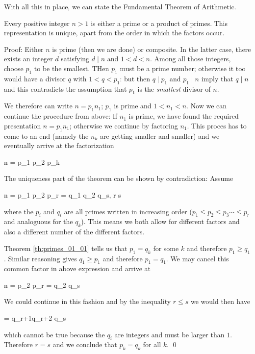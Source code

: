With all this in place, we can state the Fundamental Theorem of Arithmetic.

\begin{theorem}
    Every positive integer $n > 1$ is either a prime or a product of primes. This representation is unique, apart from the order in which the factors occur.
\end{theorem}

Proof: Either $n$ is prime (then we are done) or composite. In the latter case, there exists an integer $d$ satisfying $d \mid n$ and $1 < d < n$. Among all those integers, choose $p_1$ to be the smallest. THen $p_1$ must be a prime number; otherwise it too would have a divisor $q$ with $1 < q < p_1$: but then $q \mid p_1$ and $p_1 \mid n$ imply that $q \mid n$ and this contradicts the assumption that $p_1$ is the \emph{smallest} divisor of $n$.

We therefore can write $n = p_1 n_1$; $p_1$ is prime and $1 < n_1 < n$. Now we can continue the procedure from above: If $n_1$ is prime, we have found the required presentation $n = p_1 n_1$; otherwise we continue by factoring $n_1$. This proces has to come to an end (namely the $n_k$ are getting smaller and smaller) and we eventually arrive at the factorization

\bee
n = p_1 p_2 \cdots p_k
\eee

The uniqueness part of the theorem can be shown by contradiction: Assume

\bee
n = p_1 p_2 \cdots p_r = q_1 q_2 \cdots q_s, \quad r \leq s
\eee

where the $p_i$ and $q_i$ are all primes written in increasing order ($p_1 \leq p_2 \leq p_3 \cdots \leq p_r$ and analoguous for the $q_k$). This means we both allow for different factors and also a different number of the different factors.

Theorem \ref{th:primes_01_01} tells us that $p_1 = q_k$ for some $k$ and therefore $p_1 \geq q_1$. Similar reasoning gives $q_1 \geq p_1$ and therefore $p_1 = q_1$. We may cancel this common factor in above expression and arrive at

\bee
n = p_2 \cdots p_r = q_2 \cdots q_s
\eee

We could continue in this fashion and by the inequality $r \leq s$ we would then have

 = q_{r+1}q_{r+2} \cdots q_s
\eee

which cannot be true because the $q_i$ are integers and must be larger than $1$. Therefore $r = s$ and we conclude that $p_k = q_k$ for all $k$. \qed

